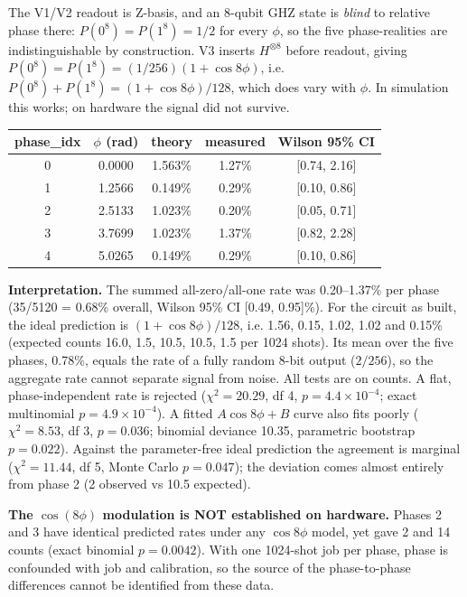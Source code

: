\documentclass[11pt,a4paper]{article}
\begin{document}
The V1/V2 readout is Z-basis, and an 8-qubit GHZ state is \emph{blind} to
relative phase there: $P(0^8)=P(1^8)=1/2$ for every $\phi$, so the five
phase-realities are indistinguishable by construction. V3 inserts $H^{\otimes 8}$
before readout, giving $P(0^8)=P(1^8)=(1/256)(1+\cos 8\phi)$, i.e.
$P(0^8)+P(1^8)=(1+\cos 8\phi)/128$, which does vary
with $\phi$. In simulation this works; on hardware the signal did not survive.

\begin{table}[h]
\centering
\begin{tabular}{ccccc}
\toprule
phase\_idx & $\phi$ (rad) & theory & measured & Wilson 95\% CI \\
\midrule
0 & 0.0000 & 1.563\% & 1.27\% & [0.74, 2.16] \\
1 & 1.2566 & 0.149\% & 0.29\% & [0.10, 0.86] \\
2 & 2.5133 & 1.023\% & 0.20\% & [0.05, 0.71] \\
3 & 3.7699 & 1.023\% & 1.37\% & [0.82, 2.28] \\
4 & 5.0265 & 0.149\% & 0.29\% & [0.10, 0.86] \\
\bottomrule
\end{tabular}
\end{table}

\textbf{Interpretation.} The summed all-zero/all-one rate was 0.20--1.37\% per
phase (35/5120 = 0.68\% overall, Wilson 95\% CI [0.49, 0.95]\%). For the circuit
as built, the ideal prediction is $(1+\cos 8\phi)/128$, i.e. 1.56, 0.15, 1.02,
1.02 and 0.15\% (expected counts 16.0, 1.5, 10.5, 10.5, 1.5 per 1024 shots). Its
mean over the five phases, 0.78\%, equals the rate of a fully random 8-bit
output ($2/256$), so the aggregate rate cannot separate signal from noise. All
tests are on counts. A flat, phase-independent rate is rejected
($\chi^2=20.29$, df 4, $p=4.4\times10^{-4}$; exact multinomial $p=4.9\times10^{-4}$).
A fitted $A\cos 8\phi+B$ curve also fits poorly ($\chi^2=8.53$, df 3, $p=0.036$;
binomial deviance 10.35, parametric bootstrap $p=0.022$). Against the
parameter-free ideal prediction the agreement is marginal ($\chi^2=11.44$, df 5,
Monte Carlo $p=0.047$); the deviation comes almost entirely from phase 2
(2 observed vs 10.5 expected).

\textbf{The $\cos(8\phi)$ modulation is NOT established on hardware.} Phases 2
and 3 have identical predicted rates under any $\cos 8\phi$ model, yet gave 2 and
14 counts (exact binomial $p=0.0042$). With one 1024-shot job per phase, phase
is confounded with job and calibration, so the source of the phase-to-phase
differences cannot be identified from these data.
\end{document}
